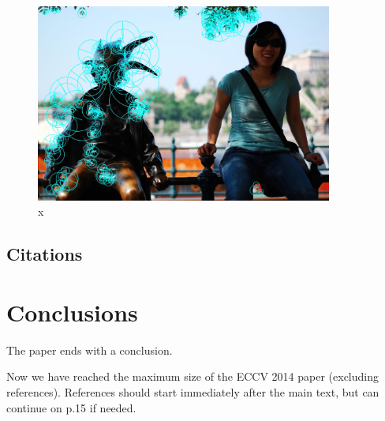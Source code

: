 \documentclass[runningheads]{llncs}
\begin{document}
\begin{figure} \centering \includegraphics[height=6.5cm]{images/yao2.jpg}
\caption{x} \label{fig:example} \end{figure}


\subsection{Citations}

\section{Conclusions}

The paper ends with a conclusion. 

\par\vfill\par
Now we have reached the maximum size of the ECCV 2014 paper (excluding references).
References should start immediately after the main text, but can continue on p.15 if needed.

\clearpage



\end{document}
